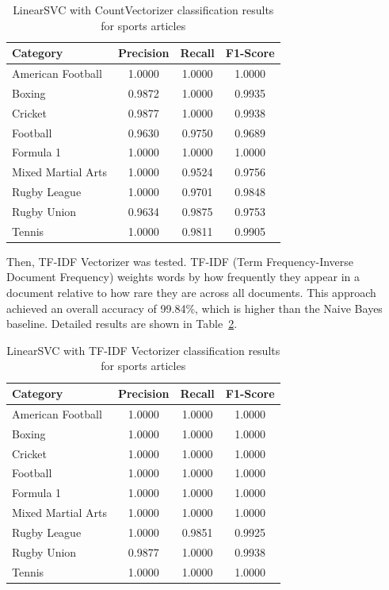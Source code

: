 \documentclass[12pt,a4paper]{article}
\begin{document}
\begin{table}[h]
\centering
\begin{tabular}{lccc}
\toprule
Category & Precision & Recall & F1-Score \\
\midrule
American Football & 1.0000 & 1.0000 & 1.0000 \\
Boxing & 0.9872 & 1.0000 & 0.9935 \\
Cricket & 0.9877 & 1.0000 & 0.9938 \\
Football & 0.9630 & 0.9750 & 0.9689 \\
Formula 1 & 1.0000 & 1.0000 & 1.0000 \\
Mixed Martial Arts & 1.0000 & 0.9524 & 0.9756 \\
Rugby League & 1.0000 & 0.9701 & 0.9848 \\
Rugby Union & 0.9634 & 0.9875 & 0.9753 \\
Tennis & 1.0000 & 0.9811 & 0.9905 \\
\bottomrule
\end{tabular}
\caption{LinearSVC with CountVectorizer classification results for sports articles}
\label{tab:sports_svc_count}
\end{table}

Then, TF-IDF Vectorizer was tested. TF-IDF (Term Frequency-Inverse Document Frequency) weights words by how frequently they appear in a document relative to how rare they are across all documents. This approach achieved an overall accuracy of 99.84\%, which is higher than the Naive Bayes baseline. Detailed results are shown in Table~\ref{tab:sports_svc_tfidf}.

\begin{table}[h]
\centering
\begin{tabular}{lccc}
\toprule
Category & Precision & Recall & F1-Score \\
\midrule
American Football & 1.0000 & 1.0000 & 1.0000 \\
Boxing & 1.0000 & 1.0000 & 1.0000 \\
Cricket & 1.0000 & 1.0000 & 1.0000 \\
Football & 1.0000 & 1.0000 & 1.0000 \\
Formula 1 & 1.0000 & 1.0000 & 1.0000 \\
Mixed Martial Arts & 1.0000 & 1.0000 & 1.0000 \\
Rugby League & 1.0000 & 0.9851 & 0.9925 \\
Rugby Union & 0.9877 & 1.0000 & 0.9938 \\
Tennis & 1.0000 & 1.0000 & 1.0000 \\
\bottomrule
\end{tabular}
\caption{LinearSVC with TF-IDF Vectorizer classification results for sports articles}
\label{tab:sports_svc_tfidf}
\end{table}
\end{document}
